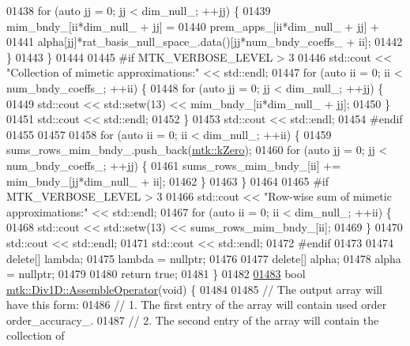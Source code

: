 \begin{DoxyCode}
{{01438     \textcolor{keywordflow}{for} (\textcolor{keyword}{auto} jj = 0; jj < dim\_null\_; ++jj) \{
01439       mim\_bndy\_[ii*dim\_null\_ + jj] =
01440         prem\_apps\_[ii*dim\_null\_ + jj] +
01441         alpha[jj]*rat\_basis\_null\_space\_.data()[jj*num\_bndy\_coeffs\_ + ii];
01442     \}
01443   \}
01444 
01445 \textcolor{preprocessor}{  #if MTK\_VERBOSE\_LEVEL > 3}
01446   std::cout << \textcolor{stringliteral}{"Collection of mimetic approximations:"} << std::endl;
01447   \textcolor{keywordflow}{for} (\textcolor{keyword}{auto} ii = 0; ii < num\_bndy\_coeffs\_; ++ii) \{
01448     \textcolor{keywordflow}{for} (\textcolor{keyword}{auto} jj = 0; jj < dim\_null\_; ++jj) \{
01449       std::cout << std::setw(13) << mim\_bndy\_[ii*dim\_null\_ + jj];
01450     \}
01451     std::cout << std::endl;
01452   \}
01453   std::cout << std::endl;
01454 \textcolor{preprocessor}{  #endif}
01455 
01457 
01458   \textcolor{keywordflow}{for} (\textcolor{keyword}{auto} ii = 0; ii < dim\_null\_; ++ii) \{
01459     sums\_rows\_mim\_bndy\_.push\_back(\hyperlink{group__c01-roots_ga59a451a5fae30d59649bcda274fea271}{mtk::kZero});
01460     \textcolor{keywordflow}{for} (\textcolor{keyword}{auto} jj = 0; jj < num\_bndy\_coeffs\_; ++jj) \{
01461       sums\_rows\_mim\_bndy\_[ii] += mim\_bndy\_[jj*dim\_null\_ + ii];
01462     \}
01463   \}
01464 
01465 \textcolor{preprocessor}{  #if MTK\_VERBOSE\_LEVEL > 3}
01466   std::cout << \textcolor{stringliteral}{"Row-wise sum of mimetic approximations:"} << std::endl;
01467   \textcolor{keywordflow}{for} (\textcolor{keyword}{auto} ii = 0; ii < dim\_null\_; ++ii) \{
01468     std::cout << std::setw(13) << sums\_rows\_mim\_bndy\_[ii];
01469   \}
01470   std::cout << std::endl;
01471   std::cout << std::endl;
01472 \textcolor{preprocessor}{  #endif}
01473 
01474   \textcolor{keyword}{delete}[] lambda;
01475   lambda = \textcolor{keyword}{nullptr};
01476 
01477   \textcolor{keyword}{delete}[] alpha;
01478   alpha = \textcolor{keyword}{nullptr};
01479 
01480   \textcolor{keywordflow}{return} \textcolor{keyword}{true};
01481 \}
01482 
\hypertarget{mtk__div__1d_8cc_source_l01483}{}\hyperlink{classmtk_1_1Div1D_a5a12482e1ceac232339dd8f647af886b}{01483} \textcolor{keywordtype}{bool} \hyperlink{classmtk_1_1Div1D_a5a12482e1ceac232339dd8f647af886b}{mtk::Div1D::AssembleOperator}(\textcolor{keywordtype}{void}) \{
01484 
01485   \textcolor{comment}{// The output array will have this form:}
01486   \textcolor{comment}{// 1. The first entry of the array will contain used order order\_accuracy\_.}
01487   \textcolor{comment}{// 2. The second entry of the array will contain the collection of}
}}
\end{DoxyCode}
